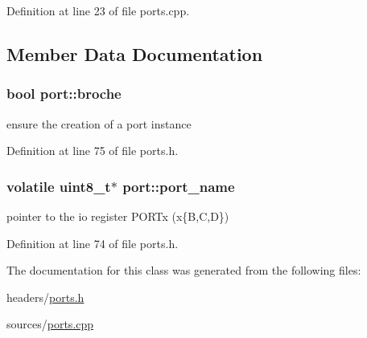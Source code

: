 Definition at line 23 of file ports.\-cpp.



\subsection{Member Data Documentation}
\hypertarget{classport_a296e1dfa3d9c7e5b8fa707355a523f6c}{
\subsubsection[{broche}]{\setlength{\rightskip}{0pt plus 5cm}bool port\-::broche\hspace{0.3cm}{\ttfamily [protected]}}}\label{classport_a296e1dfa3d9c7e5b8fa707355a523f6c}


ensure the creation of a port instance 



Definition at line 75 of file ports.\-h.

\hypertarget{classport_a7d360768f8ba1c3f2c65c0c72bafaf54}{
\subsubsection[{port\-\_\-name}]{\setlength{\rightskip}{0pt plus 5cm}volatile uint8\-\_\-t$\ast$ port\-::port\-\_\-name\hspace{0.3cm}{\ttfamily [protected]}}}\label{classport_a7d360768f8ba1c3f2c65c0c72bafaf54}


pointer to the io register P\-O\-R\-Tx (x\{B,C,D\}) 



Definition at line 74 of file ports.\-h.



The documentation for this class was generated from the following files\-:\begin{DoxyCompactItemize}
\item 
headers/\hyperlink{ports_8h}{ports.\-h}\item 
sources/\hyperlink{ports_8cpp}{ports.\-cpp}\end{DoxyCompactItemize}
